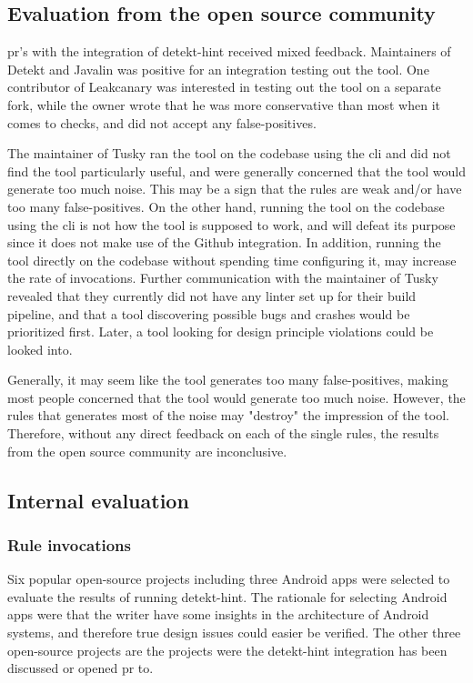 \documentclass{report}
\begin{document}
\subsection{Evaluation from the open source community}

\gls{pr}'s with the integration of detekt-hint received mixed feedback. Maintainers of Detekt and Javalin was positive for an integration testing out the tool. One contributor of Leakcanary was interested in testing out the tool on a separate fork, while the owner wrote that he was more conservative than most when it comes to checks, and did not accept any false-positives. 

The maintainer of Tusky\cite{tusky} ran the tool on the codebase using the \gls{cli} and did not find the tool particularly useful, and were generally concerned that the tool would generate too much noise. This may be a sign that the rules are weak and/or have too many false-positives. On the other hand, running the tool on the codebase using the \gls{cli} is not how the tool is supposed to work, and will defeat its purpose since it does not make use of the Github integration. In addition, running the tool directly on the codebase without spending time configuring it, may increase the rate of invocations. Further communication with the maintainer of Tusky revealed that they currently did not have any linter set up for their build pipeline, and that a tool discovering possible bugs and crashes would be prioritized first. Later, a tool looking for design principle violations could be looked into.



Generally, it may seem like the tool generates too many false-positives, making most people concerned that the tool would generate too much noise. However, the rules that generates most of the noise may "destroy" the impression of the tool. Therefore, without any direct feedback on each of the single rules, the results from the open source community are inconclusive.     
 
\subsection{Internal evaluation}
\subsubsection{Rule invocations}
Six popular open-source projects including three Android apps were selected to evaluate the results of running detekt-hint. The rationale for selecting Android apps were that the writer have some insights in the architecture of Android systems, and therefore true design issues could easier be verified. The other three open-source projects are the projects were the detekt-hint integration has been discussed or opened \gls{pr} to. 
\end{document}
